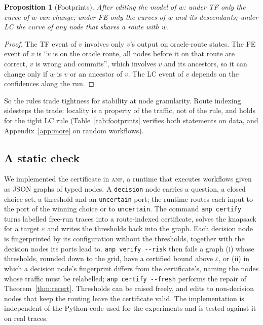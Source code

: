 \documentclass[11pt]{article}
\newtheorem{proposition}[theorem]{Proposition}
\theoremstyle{definition}
\theoremstyle{remark}
\newcommand{\eps}{\varepsilon}
\newcommand{\anp}{\textsc{anp}}
\begin{document}
\begin{proposition}[Footprints]\label{prop:footprint}
After editing the model of $w$: under \textup{TF} only the curve of $w$ can change; under
\textup{FE} only the curves of $w$ and its descendants; under \textup{LC} the curve of any node
that shares a route with $w$.
\end{proposition}
\begin{proof}
The TF event of $v$ involves only $v$'s output on oracle-route states. The FE event of $v$ is
``$v$ is on the oracle route, all nodes before it on that route are correct, $v$ is wrong and
commits'', which involves $v$ and its ancestors, so it can change only if $w$ is $v$ or an
ancestor of $v$. The LC event of $v$ depends on the confidences along the run.
\end{proof}

So the rules trade tightness for stability at node granularity. Route indexing sidesteps the
trade: locality is a property of the traffic, not of the rule, and holds for the tight LC rule
(Table~\ref{tab:footprints} verifies both statements on data, and
Appendix~\ref{app:more} on random workflows).

\subsection{A static check}\label{sec:impl}

We implemented the certificate in \anp, a runtime that executes workflows given as JSON graphs
of typed nodes. A \texttt{decision} node carries a question, a closed choice set, a threshold
and an \texttt{uncertain} port; the runtime routes each input to the port of the winning choice
or to \texttt{uncertain}. The command \texttt{anp certify} turns labelled free-run traces into
a route-indexed certificate, solves the knapsack for a target $\eps$ and writes the thresholds
back into the graph. Each decision node is fingerprinted by its configuration without the
thresholds, together with the decision nodes its ports lead to. \texttt{anp verify -{}-risk}
then fails a graph (i) whose thresholds, rounded down to the grid, have a certified bound above
$\eps$, or (ii) in which a decision node's fingerprint differs from the certificate's, naming
the nodes whose traffic must be relabelled; \texttt{anp certify -{}-fresh} performs the repair of
Theorem~\ref{thm:recert}. Thresholds can be raised freely, and edits to non-decision nodes that
keep the routing leave the certificate valid. The implementation is independent of the Python
code used for the experiments and is tested against it on real traces.
\end{document}
